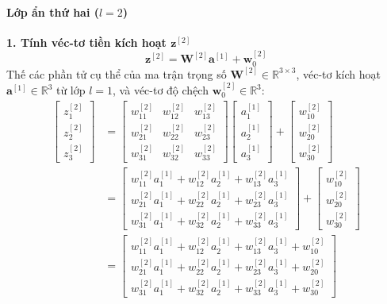 \paragraph{Lớp ẩn thứ hai ($l = 2$)\\} 
\textbf{1. Tính véc-tơ tiền kích hoạt $\mathbf{z}^{[2]}$}
\begin{equation}
    \mathbf{z}^{[2]} = \mathbf{W}^{[2]} \mathbf{a}^{[1]} + \mathbf{w}_0^{[2]}
\end{equation}
Thế các phần tử cụ thể của ma trận trọng số $\mathbf{W}^{[2]} \in \mathbb{R}^{3 \times 3}$, véc-tơ kích hoạt $\mathbf{a}^{[1]} \in \mathbb{R}^3$ từ lớp $l=1$, và véc-tơ độ chệch $\mathbf{w}_0^{[2]} \in \mathbb{R}^3$:
\begin{align}
    \begin{bmatrix} z_1^{[2]} \\ z_2^{[2]} \\ z_3^{[2]} \end{bmatrix} 
    &= \begin{bmatrix} 
        w_{11}^{[2]} & w_{12}^{[2]} & w_{13}^{[2]} \\ 
        w_{21}^{[2]} & w_{22}^{[2]} & w_{23}^{[2]} \\ 
        w_{31}^{[2]} & w_{32}^{[2]} & w_{33}^{[2]} 
    \end{bmatrix}
    \begin{bmatrix} a_1^{[1]} \\ a_2^{[1]} \\ a_3^{[1]} \end{bmatrix} 
    + \begin{bmatrix} w_{10}^{[2]} \\ w_{20}^{[2]} \\ w_{30}^{[2]} \end{bmatrix} \nonumber \\
    &= \begin{bmatrix}
        w_{11}^{[2]} a_1^{[1]} + w_{12}^{[2]} a_2^{[1]} + w_{13}^{[2]} a_3^{[1]} \\
        w_{21}^{[2]} a_1^{[1]} + w_{22}^{[2]} a_2^{[1]} + w_{23}^{[2]} a_3^{[1]} \\
        w_{31}^{[2]} a_1^{[1]} + w_{32}^{[2]} a_2^{[1]} + w_{33}^{[2]} a_3^{[1]}
    \end{bmatrix}
    + \begin{bmatrix} w_{10}^{[2]} \\ w_{20}^{[2]} \\ w_{30}^{[2]} \end{bmatrix} \nonumber \\
    &= \begin{bmatrix} 
        w_{11}^{[2]} a_1^{[1]} + w_{12}^{[2]} a_2^{[1]} + w_{13}^{[2]} a_3^{[1]} + w_{10}^{[2]} \\
        w_{21}^{[2]} a_1^{[1]} + w_{22}^{[2]} a_2^{[1]} + w_{23}^{[2]} a_3^{[1]} + w_{20}^{[2]} \\
        w_{31}^{[2]} a_1^{[1]} + w_{32}^{[2]} a_2^{[1]} + w_{33}^{[2]} a_3^{[1]} + w_{30}^{[2]} 
    \end{bmatrix}
\end{align}
